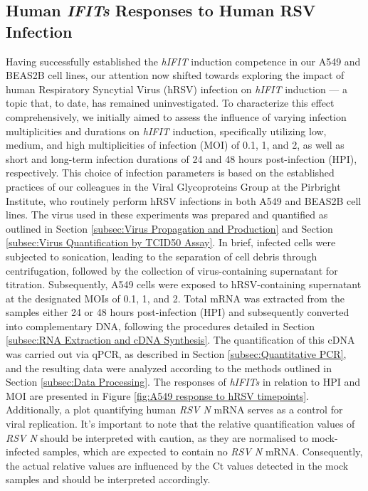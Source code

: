 \subsection{Human \textit{IFITs} Responses to Human RSV Infection} \label{subsec:Human IFITs Responses to Human RSV}
Having successfully established the \textit{hIFIT} induction competence in our A549 and BEAS2B cell lines, our attention now shifted towards exploring the impact of human Respiratory Syncytial Virus (hRSV) infection on \textit{hIFIT} induction — a topic that, to date, has remained uninvestigated. To characterize this effect comprehensively, we initially aimed to assess the influence of varying infection multiplicities and durations on \textit{hIFIT} induction, specifically utilizing low, medium, and high multiplicities of infection (MOI) of 0.1, 1, and 2, as well as short and long-term infection durations of 24 and 48 hours post-infection (HPI), respectively. This choice of infection parameters is based on the established practices of our colleagues in the Viral Glycoproteins Group at the Pirbright Institute, who routinely perform hRSV infections in both A549 and BEAS2B cell lines. The virus used in these experiments was prepared and quantified as outlined in Section \ref{subsec:Virus Propagation and Production} and Section \ref{subsec:Virus Quantification by TCID50 Assay}. In brief, infected cells were subjected to sonication, leading to the separation of cell debris through centrifugation, followed by the collection of virus-containing supernatant for titration. Subsequently, A549 cells were exposed to hRSV-containing supernatant at the designated MOIs of 0.1, 1, and 2. Total mRNA was extracted from the samples either 24 or 48 hours post-infection (HPI) and subsequently converted into complementary DNA, following the procedures detailed in Section \ref{subsec:RNA Extraction and cDNA Synthesis}. The quantification of this cDNA was carried out via qPCR, as described in Section \ref{subsec:Quantitative PCR}, and the resulting data were analyzed according to the methods outlined in Section \ref{subsec:Data Processing}. The responses of \textit{hIFITs} in relation to HPI and MOI are presented in Figure \ref{fig:A549 response to hRSV timepoints}. Additionally, a plot quantifying human \textit{RSV N} mRNA serves as a control for viral replication. It's important to note that the relative quantification values of \textit{RSV N} should be interpreted with caution, as they are normalised to mock-infected samples, which are expected to contain no \textit{RSV N} mRNA. Consequently, the actual relative values are influenced by the Ct values detected in the mock samples and should be interpreted accordingly.

